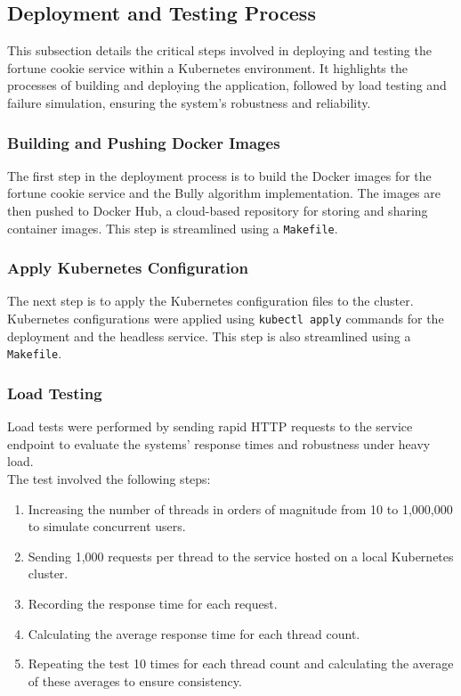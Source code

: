 \documentclass{article}
\begin{document}
  \subsection{Deployment and Testing Process}
    This subsection details the critical steps involved in deploying and testing the fortune cookie service within a Kubernetes environment. It highlights the processes of building and deploying the application, followed by load testing and failure simulation, ensuring the system's robustness and reliability.
      \subsubsection{Building and Pushing Docker Images} 
        The first step in the deployment process is to build the Docker images for the fortune cookie service and the Bully algorithm implementation. The images are then pushed to Docker Hub, a cloud-based repository for storing and sharing container images. This step is streamlined using a \texttt{Makefile}.
      \subsubsection{Apply Kubernetes Configuration} 
        The next step is to apply the Kubernetes configuration files to the cluster. Kubernetes configurations were applied using \texttt{kubectl apply} commands for the deployment and the headless service. This step is also streamlined using a \texttt{Makefile}.
      \subsubsection{Load Testing}
        Load tests were performed by sending rapid HTTP requests to the service endpoint to evaluate the systems' response times and robustness under heavy load. \\
        The test involved the following steps:

        \begin{enumerate}
            \item Increasing the number of threads in orders of magnitude from 10 to 1,000,000 to simulate concurrent users.
            \item Sending 1,000 requests per thread to the service hosted on a local Kubernetes cluster.
            \item Recording the response time for each request.
            \item Calculating the average response time for each thread count.
            \item Repeating the test 10 times for each thread count and calculating the average of these averages to ensure consistency.
        \end{enumerate}
\end{document}

